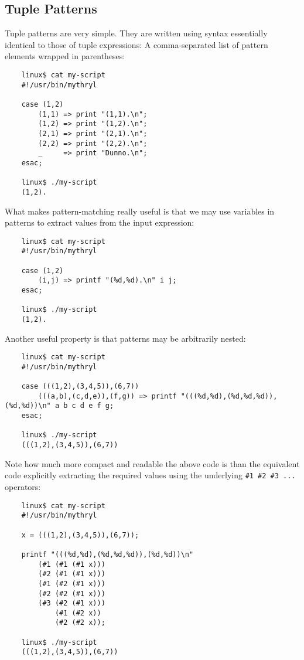 \cutend*


\subsection{Tuple Patterns}
\label{section:ref:case-expressions-and-pattern-matching:tuple-patterns}

Tuple patterns are very simple.  They are written using syntax 
essentially identical to those of tuple expressions:  A 
comma-separated list of pattern elements wrapped in parentheses: 

\begin{verbatim}
    linux$ cat my-script
    #!/usr/bin/mythryl

    case (1,2)
        (1,1) => print "(1,1).\n";
        (1,2) => print "(1,2).\n";
        (2,1) => print "(2,1).\n";
        (2,2) => print "(2,2).\n";
        _     => print "Dunno.\n";
    esac;

    linux$ ./my-script
    (1,2).
\end{verbatim}

What makes pattern-matching really useful is that 
we may use variables in patterns to extract values 
from the input expression:

\begin{verbatim}
    linux$ cat my-script
    #!/usr/bin/mythryl

    case (1,2)
        (i,j) => printf "(%d,%d).\n" i j;
    esac;

    linux$ ./my-script
    (1,2).
\end{verbatim}

Another useful property is that patterns may be 
arbitrarily nested:

\begin{verbatim}
    linux$ cat my-script
    #!/usr/bin/mythryl

    case (((1,2),(3,4,5)),(6,7))
        (((a,b),(c,d,e)),(f,g)) => printf "(((%d,%d),(%d,%d,%d)),(%d,%d))\n" a b c d e f g;
    esac;

    linux$ ./my-script
    (((1,2),(3,4,5)),(6,7))
\end{verbatim}

Note how much more compact and readable the above code is than the 
equivalent code explicitly extracting the required 
values using the underlying {\tt \#1 \#2 \#3 ...} operators:

\begin{verbatim}
    linux$ cat my-script
    #!/usr/bin/mythryl

    x = (((1,2),(3,4,5)),(6,7));

    printf "(((%d,%d),(%d,%d,%d)),(%d,%d))\n"
        (#1 (#1 (#1 x)))
        (#2 (#1 (#1 x)))
        (#1 (#2 (#1 x)))
        (#2 (#2 (#1 x)))
        (#3 (#2 (#1 x)))
            (#1 (#2 x))
            (#2 (#2 x));

    linux$ ./my-script
    (((1,2),(3,4,5)),(6,7))
\end{verbatim}

